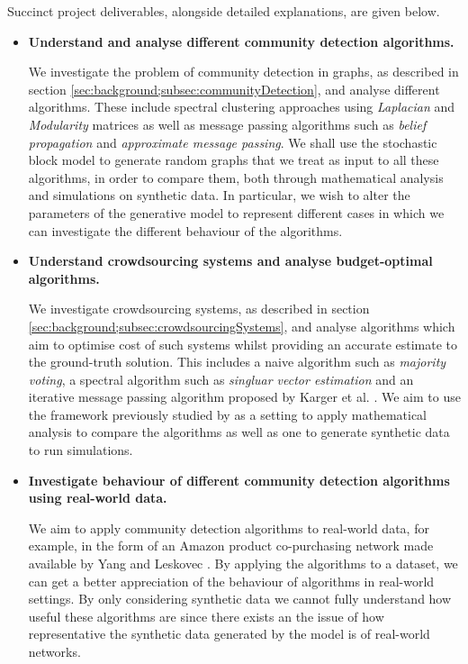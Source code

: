 \documentclass[12pt]{article}
\numberwithin{equation}{section}
\begin{document}
Succinct project deliverables, alongside detailed explanations, are given below.
\begin{itemize}
	\item \textbf{Understand and analyse different community detection algorithms.}

	We investigate the problem of community detection in graphs, as described in section \ref{sec:background;subsec:communityDetection}, and analyse different algorithms. These include spectral clustering approaches using \textit{Laplacian} and \textit{Modularity} matrices as well as message passing algorithms such as \textit{belief propagation} and \textit{approximate message passing}. We shall use the stochastic block model to generate random graphs that we treat as input to all these algorithms, in order to compare them, both through mathematical analysis and simulations on synthetic data. In particular, we wish to alter the parameters of the generative model to represent different cases in which we can investigate the different behaviour of the algorithms. 

	\item \textbf{Understand crowdsourcing systems and analyse budget-optimal algorithms.}

	We investigate crowdsourcing systems, as described in section \ref{sec:background;subsec:crowdsourcingSystems}, and analyse algorithms which aim to optimise cost of such systems whilst providing an accurate estimate to the ground-truth solution. This includes a naive algorithm such as \textit{majority voting}, a spectral algorithm such as \textit{singluar vector estimation} and an iterative message passing algorithm proposed by Karger et al. \cite{KOS13}. We aim to use the framework previously studied by \cite{KOS13} as a setting to apply mathematical analysis to compare the algorithms as well as one to generate synthetic data to run simulations.

	\item \textbf{Investigate behaviour of different community detection algorithms using real-world data.}

	We aim to apply community detection algorithms to real-world data, for example, in the form of an Amazon product co-purchasing network made available by Yang and Leskovec \cite{YL12}. By applying the algorithms to a dataset, we can get a better appreciation of the behaviour of algorithms in real-world settings. By only considering synthetic data we cannot fully understand how useful these algorithms are since there exists an the issue of how representative the synthetic data generated by the model is of real-world networks.
\end{itemize}
\end{document}
